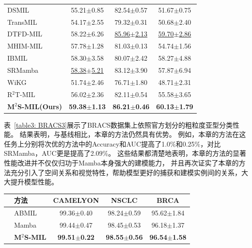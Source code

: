 {\begin{xltabular}{\textwidth}{XCCC}
  DSMIL~\cite{li2021dual}          & 55.21$\pm$0.85 & 82.54$\pm$0.57 & 51.67$\pm$0.75\\
  TransMIL~\cite{shao2021transmil} & 54.17$\pm$2.55 & 79.32$\pm$0.31 & 50.68$\pm$2.40  \\
  DTFD-MIL~\cite{zhang2022dtfd}    & 58.22$\pm$6.26 &\underline{85.96$\pm$2.13} &\underline{59.70$\pm$2.86} \\
  MHIM-MIL~\cite{tang2023multiple}    &57.78$\pm$1.28 & 81.03$\pm$0.13 &54.74$\pm$1.56 \\
  IBMIL~\cite{lin2023interventional}    & 58.30$\pm$3.58 & 80.07$\pm$2.42 & 58.27$\pm$4.88\\
  SRMamba ~\cite{yang2024mambamil}& \underline{58.38$\pm$5.21}&83.12$\pm$3.90 & 57.87$\pm$6.94 \\
  WiKG ~\cite{li2024dynamic}& 51.74$\pm$2.46 & 76.71$\pm$1.80 & 48.71$\pm$2.31 \\
  R$^2$T-MIL ~\cite{tang2024feature}& 56.02$\pm$2.36 &82.11$\pm$0.54 & 55.58$\pm$3.65  \\
  \textbf{M$^2$S-MIL(Ours)} &\textbf{59.38$\pm$1.13} &\textbf{86.21$\pm$0.46} & \textbf{60.13$\pm$1.79}\\

\end{xltabular}}




表~\ref{table3: BRACS3}展示了BRACS数据集上依照官方划分的粗粒度亚型分类性能。
结果表明，与基线相比，本章的方法仍然具有优势。
例如，本章的方法在这任务上分别将次优的方法中的Accuracy和AUC提高了1.0\%和0.25\%，对比SRMamba，AUC更是提高了2.09\%。
这些结果都清楚地表明，本章的方法的显著性能改进并不仅仅归功于Mamba本身强大的建模能力，
并且再次证实了本章的方法充分引入了空间关系和视觉特性，帮助模型更好的捕获和建模实例间的关系，大大提升模型性能。

\begin{table}[h!]
  \large    %
  \centering
  \begin{tabularx}{\textwidth}{clCCC}
    \toprule
    &方法  & CAMELYON& NSCLC&BRCA\\ \midrule
    &
    ABMIL &  99.36$\pm$0.40 & 98.24$\pm$0.59 & 95.62$\pm$1.84   \\
    &Mamba  & 99.44$\pm$0.47 & 98.45$\pm$0.53 & 96.18$\pm$1.37  \\
    &\textbf{M$^2$S-MIL}  &  \textbf{99.51$\pm$0.22} & \textbf{98.55$\pm$0.56} & \textbf{96.54$\pm$1.58}  \\    \bottomrule
  \end{tabularx}
  \label{table3: UNI}
\end{table}

